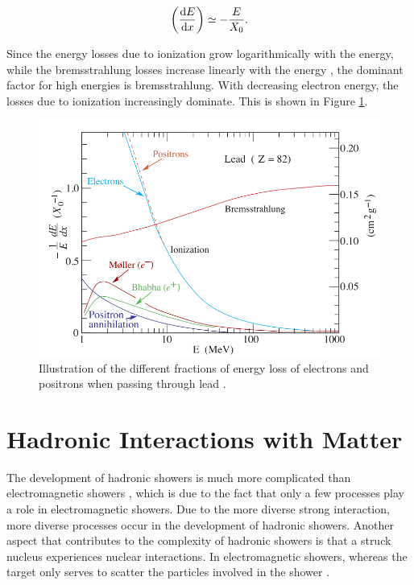 \documentclass[12pt, a4paper]{thesis}
\begin{document}
\begin{align}
  \left( \dv{E}{x} \right) \simeq - \frac{E}{X_0}.
\end{align}

Since the energy losses due to ionization grow logarithmically with
the energy, while the bremsstrahlung losses increase linearly with the
energy \cite{PhysRevD.98.030001}, the dominant factor for high
energies is bremsstrahlung. With decreasing electron energy, the
losses due to ionization increasingly dominate. This is shown in
Figure \ref{bremsstrahlung}.

\begin{figure}[H]
  \centering
  \includegraphics[width=0.8 \textwidth]{../images/bremsstrahlung.png}
  \caption{ Illustration of the different fractions of energy loss of
    electrons and positrons when passing through lead
    \cite{PhysRevD.98.030001}.}
  \label{bremsstrahlung}
\end{figure}

\section{Hadronic Interactions with Matter}
\label{sec:org39e1a53}

The development of hadronic showers is much more complicated than
electromagnetic showers \cite{wigman18}, which is due to the fact that
only a few processes play a role in electromagnetic showers.  Due to
the more diverse strong interaction, more diverse processes occur in
the development of hadronic showers. Another aspect that contributes
to the complexity of hadronic showers is that a struck nucleus
experiences nuclear interactions. In electromagnetic showers, whereas
the target only serves to scatter the particles involved in the shower
\cite{wigman18}.
\end{document}
